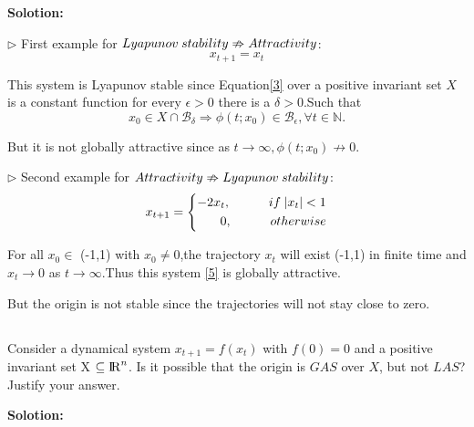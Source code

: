 \documentclass[a4paper,11pt,reqno]{amsart}
\newcommand{\R}{{\rm I\!R}}
\begin{document}
\textbf{Solotion:}

$\rhd$ First example for $Lyapunov \hspace{0.25em} stability \nRightarrow Attractivity$:
\begin{equation}
    x_{t+1} = x_t
    \label{3}
\end{equation}

This system is Lyapunov stable since Equation\eqref{3} over a positive invariant set $X$
is a constant function for every $\epsilon > 0$ there is a $\delta > 0$.Such that
\begin{equation}
    x_0 \in X \cap \mathcal{B_\delta} \Longrightarrow \phi(t;x_0) \in \mathcal{B_\epsilon},{\forall} t \in \mathds{N}. 
\end{equation}

But it is not globally attractive since as $t \rightarrow \infty,\phi(t;x_0) \nrightarrow 0$.

$\rhd$ Second example for $Attractivity \nRightarrow Lyapunov \hspace{0.25em} stability$:
\begin{equation}
    x_{t+1}=\left\{
    \begin{aligned}
    -2x_t, \hspace{3em} if \hspace{0.25em} |x_t| < 1 \\
    0, \hspace{3em} otherwise
    \label{5}
    \end{aligned}
    \right.
\end{equation}

For all $x_0 \in$ (-1,1) with $x_0 \neq 0$,the trajectory $x_t$ will exist (-1,1) in finite time
and $x_t \rightarrow 0$ as $t \rightarrow \infty$.Thus this system \eqref{5} is globally attractive.

But the origin is not stable since the trajectories will not stay close to zero.
\subsection{}
Consider a dynamical system $x_{t+1} = f(x_t)$ with $f(0) = 0$ and a positive invariant set X $\subseteq \R^n$.
Is it possible that the origin is $GAS$ over $X$, but not $LAS$? Justify your answer.

\textbf{Solotion:}

\end{document}
